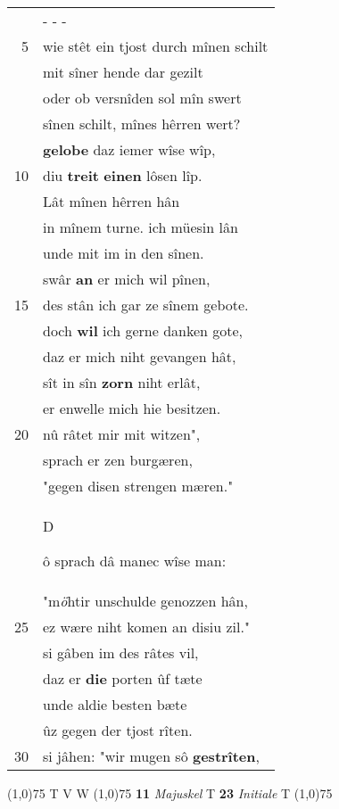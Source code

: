 \documentclass[8pt,a4paper,notitlepage]{article}
\begin{document}
\begin{table}[ht]
\begin{minipage}[t]{0.5\linewidth}
\begin{tabular}{rl}
 & \multicolumn{1}{l}{ - - - }\\ 
5 & wie stêt ein tjost durch mînen schilt\\ 
 & mit sîner hende dar gezilt\\ 
 & oder ob versnîden sol mîn swert\\ 
 & sînen schilt, mînes hêrren wert?\\ 
 & \textbf{gelobe} daz iemer wîse wîp,\\ 
10 & diu \textbf{treit} \textbf{einen} lôsen lîp.\\ 
 & Lât mînen hêrren hân\\ 
 & in mînem turne. ich müesin lân\\ 
 & unde mit im in den sînen.\\ 
 & swâr \textbf{an} er mich wil pînen,\\ 
15 & des stân ich gar ze sînem gebote.\\ 
 & doch \textbf{wil} ich gerne danken gote,\\ 
 & daz er mich niht gevangen hât,\\ 
 & sît in sîn \textbf{zorn} niht erlât,\\ 
 & er enwelle mich hie besitzen.\\ 
20 & nû râtet mir mit witzen",\\ 
 & sprach er zen burgæren,\\ 
 & "gegen disen strengen mæren."\\ 
 & \begin{large}D\end{large}ô sprach dâ manec wîse man:\\ 
 & "m\textit{ö}htir unschulde genozzen hân,\\ 
25 & ez wære niht komen an disiu zil."\\ 
 & si gâben im des râtes vil,\\ 
 & daz er \textbf{die} porten ûf tæte\\ 
 & unde aldie besten bæte\\ 
 & ûz gegen der tjost rîten.\\ 
30 & si jâhen: "wir mugen sô \textbf{gestrîten},\\ 
\end{tabular}
\scriptsize
\line(1,0){75} \newline
T V W \newline
\line(1,0){75} \newline
\textbf{11} \textit{Majuskel} T  \textbf{23} \textit{Initiale} T  \newline
\line(1,0){75} \newline

\end{minipage}
\end{table}
\end{document}
